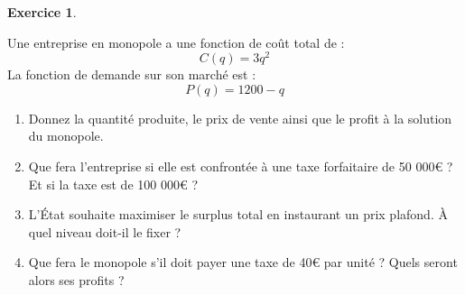 \documentclass[
]{book}
\providecommand{\tightlist}{%
  \setlength{\itemsep}{0pt}\setlength{\parskip}{0pt}}
\theoremstyle{definition}
\theoremstyle{definition}
\theoremstyle{definition}
\newtheorem{exercise}{Exercice}[chapter]
\theoremstyle{definition}
\theoremstyle{remark}
\begin{document}
\begin{exercise}
\protect\hypertarget{exr:naturelexo4}{}\label{exr:naturelexo4}

Une entreprise en monopole a une fonction de coût total de :
\[C(q)=3q^2\]
La fonction de demande sur son marché est :
\[P(q)=1200-q\]

\begin{enumerate}
\def\labelenumi{\arabic{enumi}.}
\tightlist
\item
  Donnez la quantité produite, le prix de vente ainsi que le
  profit à la solution du monopole.
\item
  Que fera l'entreprise si elle est confrontée à une taxe
  forfaitaire de 50 000€ ? Et si la taxe est de 100 000€ ?
\item
  L'État souhaite maximiser le surplus total en instaurant un
  prix plafond. À quel niveau doit-il le fixer ?
\item
  Que fera le monopole s'il doit payer une taxe de 40€
  par unité ? Quels seront alors ses profits ?
\end{enumerate}

\end{exercise}
\end{document}
